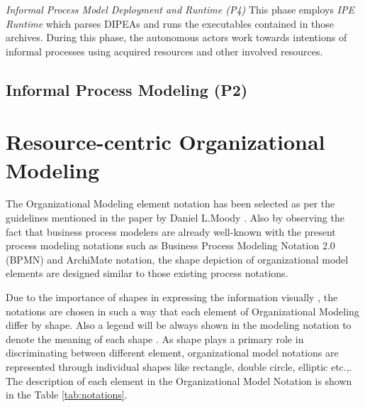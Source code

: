 \textit{Informal Process Model Deployment and Runtime (P4)} This phase employs \textit{IPE Runtime} which parses DIPEAs and runs the executables contained in those archives. During this phase, the autonomous actors work towards intentions of informal processes using acquired resources and other involved resources.  \\


\subsection{Informal Process Modeling (P2)}
\label{subsec:informalprocessmodeling}

\section{Resource-centric Organizational Modeling}
 The Organizational Modeling element notation has been selected as per the guidelines mentioned in the paper by Daniel L.Moody \cite{Moody2009}. Also by observing  the fact that business process modelers are already well-known with the present process modeling notations such as Business Process Modeling Notation 2.0 (BPMN) \cite{bpm2011} and ArchiMate notation\cite{arc2013}, the shape depiction of organizational model elements are designed similar to those existing process notations. 

 Due to the importance of shapes in expressing the information visually , the notations are chosen in such a way that each element of Organizational Modeling  differ by shape. Also a legend will be always shown in the modeling notation to denote the meaning of each shape \cite{Moody2009}. As shape plays a primary role in discriminating between different element, organizational model notations are represented through individual shapes like rectangle, double circle, elliptic etc.,. The description of each element in the Organizational Model Notation is shown in the Table \ref{tab:notations}. 

